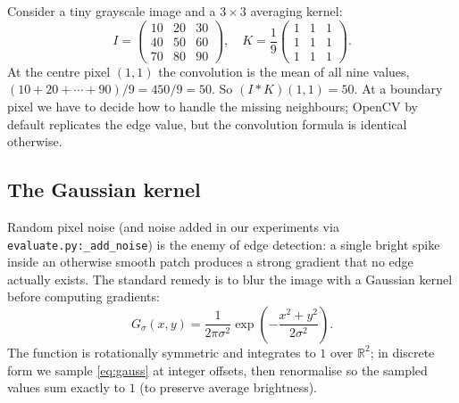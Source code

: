 \begin{example}
Consider a tiny grayscale image and a $3\times 3$ averaging kernel:
\[
I = \begin{pmatrix}10 & 20 & 30 \\ 40 & 50 & 60 \\ 70 & 80 & 90\end{pmatrix},\quad
K = \frac{1}{9}\begin{pmatrix}1&1&1\\1&1&1\\1&1&1\end{pmatrix}.
\]
At the centre pixel $(1,1)$ the convolution is the mean of all nine
values, $(10+20+\cdots+90)/9 = 450/9 = 50$. So $(I*K)(1,1)=50$. At a
boundary pixel we have to decide how to handle the missing neighbours;
OpenCV by default replicates the edge value, but the convolution
formula is identical otherwise.
\end{example}

\subsection{The Gaussian kernel}

Random pixel noise (and noise added in our experiments via
\texttt{evaluate.py:\_add\_noise}) is the enemy of edge detection: a
single bright spike inside an otherwise smooth patch produces a strong
gradient that no edge actually exists. The standard remedy is to blur
the image with a Gaussian kernel before computing gradients:
\begin{equation}
G_\sigma(x,y) = \frac{1}{2\pi\sigma^2}\exp\!\left(-\frac{x^2+y^2}{2\sigma^2}\right).
\label{eq:gauss}
\end{equation}
The function is rotationally symmetric and integrates to $1$ over
$\mathbb{R}^2$; in discrete form we sample \eqref{eq:gauss} at integer
offsets, then renormalise so the sampled values sum exactly to $1$ (to
preserve average brightness).

